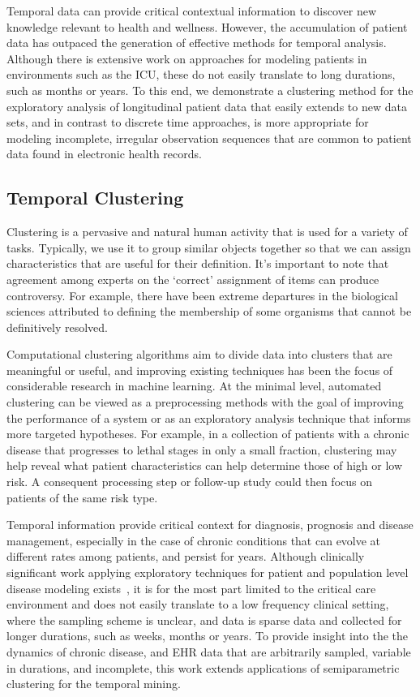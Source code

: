 
Temporal data can provide critical contextual information
to discover new knowledge relevant to health and wellness.
However, the accumulation of patient data has outpaced the
generation of effective methods for temporal analysis. Although there is extensive work on approaches for modeling
patients in environments such as the ICU, these do not easily
translate to long durations, such as months or years. To this
end, we demonstrate a clustering method for the exploratory
analysis of longitudinal patient data that easily extends to
new data sets, and in contrast to discrete time approaches, is
more appropriate for modeling incomplete, irregular observation sequences that are common to patient data found in
electronic health records.

\subsection{Temporal Clustering}
Clustering is a pervasive and natural human activity that is used for a variety of tasks. Typically, we use it to group similar objects together so that we can assign characteristics that are useful for their definition.  It's important to note that agreement among experts on the `correct' assignment of items can produce controversy.  For example, there have been extreme departures in the biological sciences attributed to defining the membership of some organisms that cannot be definitively resolved.

Computational clustering algorithms aim to divide data into clusters that are meaningful or useful, and improving existing techniques has been the focus of considerable research in machine learning.  At the minimal level, automated clustering can be viewed as a preprocessing methods with the goal of improving the performance of a system or as an exploratory analysis technique that informs more targeted hypotheses. For example, in a collection of patients with a chronic disease that progresses to lethal stages in only a small fraction, clustering may help reveal what patient characteristics can help determine those of high or low risk. A consequent processing step or follow-up study could then focus on patients of the same risk type.

Temporal information provide critical context for diagnosis, prognosis and disease management, especially in the case of chronic conditions that can evolve at different rates among patients, and persist for years.   Although clinically significant work applying exploratory techniques for patient and population level disease modeling exists~\cite{Marlin12,Saria07}, it is for the most part limited to the critical care environment and does not easily translate to a low frequency clinical setting, where the sampling scheme is unclear, and data is sparse data and collected for longer durations, such as weeks, months or years. To provide insight into the the dynamics of chronic disease, and EHR data that are arbitrarily sampled, variable in durations, and incomplete, this work extends applications of semiparametric clustering for the temporal mining.

